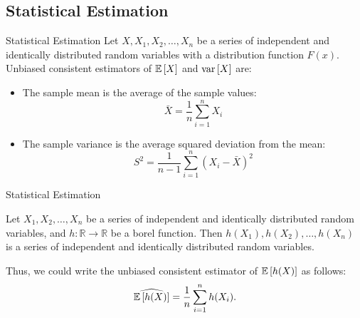 \subsection{Statistical Estimation}
    \begin{frame}{Statistical Estimation}
        Let $X, X_1, X_2, \dots, X_n$ be a series of independent and identically distributed random variables with a distribution function $F(x)$.
        Unbiased consistent estimators of $\mathbb{E}\left[X\right]$ and $\operatorname*{var} \left[X\right]$ are:
        \begin{itemize}
            \item The sample mean is the average of the sample values:
            \begin{equation}
                \bar{X} = \frac{1}{n} \sum_{i=1}^n X_i
            \end{equation}
            \item The sample variance is the average squared deviation from the mean:
            \begin{equation}
                S^2 = \frac{1}{n-1} \sum_{i=1}^n (X_i - \bar{X})^2
            \end{equation}
        \end{itemize}
    \end{frame}
    
    \begin{frame}{Statistical Estimation}
        \begin{lemma}
            Let $X_1, X_2, \dots, X_n$ be a series of independent and identically distributed random variables, and $h: \mathbb{R} \to \mathbb{R}$ be a borel function. Then $h(X_1), h(X_2), \dots, h(X_n)$ is a series of independent and identically distributed random variables.
        \end{lemma}
        Thus, we could write the unbiased consistent estimator of $\mathbb{E} \left[h(X)\right]$ as follows:
        \begin{equation}
            \widehat{\mathbb{E} \left[h(X)\right]} = \frac{1}{n} \sum_{i=1}^n h(X_i).
        \end{equation}
    \end{frame}


